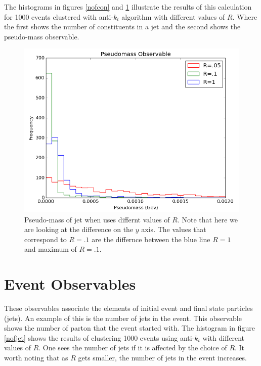 The histograms in figures \ref{nofcon} and  \ref{pseudomass} illustrate the results of this calculation for 1000 events clustered with anti-$k_t$ algorithm with different values of $R$. Where the first shows the number of constituents in a jet and the second shows the pseudo-mass observable.
\begin{figure}[hbtp]
 \centering
 \includegraphics[scale=.7]{images/figure_13.png}
 \caption{Pseudo-mass of jet when uses differnt values of $R$.  Note that here we are looking at the difference on the $y$ axis. The values that correspond to $R = .1$ are the differnce between the blue line $R = 1$ and maximum of $R = .1$.}\label{pseudomass}
\end{figure}

  


\section{Event Observables} 

These observables associate the elements of initial event and final state particles (jets). An example of this is the number of jets in the event. This observable shows the number of parton that the event started with.
The histogram in figure \ref{nofjet} shows the results of clustering 1000 events using anti-$k_t$ with different values of $R$. One sees the number of jets if it is affected by the choice of $R$. It worth noting that as $R$ gets smaller, the number of jets in the event increases. 

